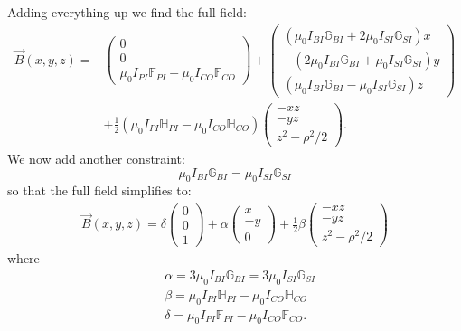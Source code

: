 \documentclass{book}
\theoremstyle{definition}
\newcommand{\al}{\alpha}
\newcommand{\f}[2]{\frac{#1}{#2}}
\newcommand{\lp}{\left(}
\newcommand{\rp}{\right)}
\begin{document}
Adding everything up we find the full field:
\begin{align*}
\vec{B}(x,y,z) = 
&\begin{pmatrix}
0\\
0\\ 
\mu_0 I_{PI} \mathbb{F}_{PI} - \mu_0 I_{CO} \mathbb{F}_{CO} 
\end{pmatrix}
+ 
\begin{pmatrix}
(\mu_0 I_{BI}\mathbb{G}_{BI}  +2 \mu_0 I_{SI} \mathbb{G}_{SI}  )x\\
-(2\mu_0 I_{BI}\mathbb{G}_{BI} +\mu_0 I_{SI} \mathbb{G}_{SI})y\\
(\mu_0 I_{BI} \mathbb{G}_{BI} - \mu_0 I_{SI} \mathbb{G}_{SI})z
\end{pmatrix}\\
&+ \f{1}{2} \lp \mu_0 I_{PI}\mathbb{H}_{PI} -\mu_0 I_{CO}\mathbb{H}_{CO}  \rp \begin{pmatrix}
-xz\\-yz\\z^2 - \rho^2/2
\end{pmatrix}.
\end{align*}
We now add another constraint:
\begin{equation*}
\mu_0 I_{BI} \mathbb{G}_{BI} = \mu_0 I_{SI} \mathbb{G}_{SI}
\end{equation*}
so that the full field simplifies to:
\begin{align*}
\vec{B}(x,y,z) = 
\delta \begin{pmatrix}
0\\
0\\ 
1
\end{pmatrix}
+ 
\al \begin{pmatrix}
x\\
-y\\
0
\end{pmatrix}
+ \f{1}{2}\beta \begin{pmatrix}
-xz\\-yz\\z^2 - \rho^2/2
\end{pmatrix}
\end{align*}
where
\begin{align*}
&\al = 3\mu_0 I_{BI}\mathbb{G}_{BI} = 3\mu_0 I_{SI}\mathbb{G}_{SI}\\
&\beta = \mu_0 I_{PI}\mathbb{H}_{PI} -\mu_0 I_{CO}\mathbb{H}_{CO} \\
&\delta = \mu_0 I_{PI} \mathbb{F}_{PI} - \mu_0 I_{CO} \mathbb{F}_{CO} .
\end{align*}
\end{document}
